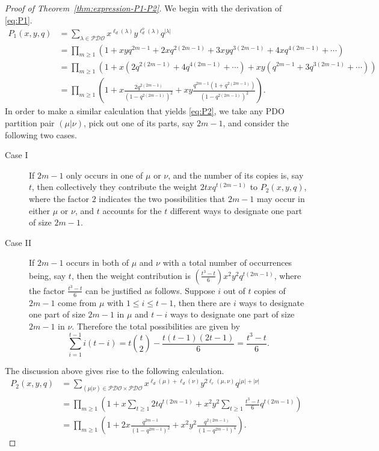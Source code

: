\documentclass[11pt,reqno]{amsart}
\numberwithin{equation}{section}
\theoremstyle{plain}
\theoremstyle{definition}
\theoremstyle{named}
\newcommand{\abs}[1]{\left|#1\right|}
\def\PDOset{\mathcal{PDO}}
\def\ld{\ell_d}
\def\lr{\ell_r}
\begin{document}
\begin{proof}[Proof of Theorem~\ref{thm:expression-P1-P2}]
We begin with the derivation of \eqref{eq:P1}.
\begin{align*}
P_1(x,y,q) &= \sum_{\lambda\in\PDOset}x^{\ell_d(\lambda)}y^{\ell_d^o(\lambda)}q^{\abs{\lambda}}\\
&= \prod_{m\ge 1}(1+xyq^{2m-1}+2xq^{2(2m-1)}+3xyq^{3(2m-1)}+4xq^{4(2m-1)}+\cdots)\\
&= \prod_{m\ge 1}(1+x(2q^{2(2m-1)}+4q^{4(2m-1)}+\cdots)+xy(q^{2m-1}+3q^{3(2m-1)}+\cdots))\\
&= \prod_{m\ge 1}\left(1+x\frac{2q^{2(2m-1)}}{(1-q^{2(2m-1)})^2}+xy\frac{q^{2m-1}(1+q^{2(2m-1)})}{(1-q^{2(2m-1)})^2}\right).
\end{align*}
In order to make a similar calculation that yields \eqref{eq:P2}, we take any PDO partition pair $(\mu | \nu)$, pick out one of its parts, say $2m-1$, and consider the following two cases.
\begin{description}
    \item[Case I] If $2m-1$ only occurs in one of $\mu$ or $\nu$, and the number of its copies is, say $t$, then collectively they contribute the weight $2txq^{t(2m-1)}$ to $P_2(x,y,q)$, where the factor $2$ indicates the two possibilities that $2m-1$ may occur in either $\mu$ or $\nu$, and $t$ accounts for the $t$ different ways to designate one part of size $2m-1$.
    \item[Case II] If $2m-1$ occurs in both of $\mu$ and $\nu$ with a total number of occurrences being, say $t$, then the weight contribution is $(\frac{t^3-t}{6})x^2y^2q^{t(2m-1)}$, where the factor $\frac{t^3-t}{6}$ can be justified as follows. Suppose $i$ out of $t$ copies of $2m-1$ come from $\mu$ with $1\le i\le t-1$, then there are $i$ ways to designate one part of size $2m-1$ in $\mu$ and $t-i$ ways to designate one part of size $2m-1$ in $\nu$. Therefore the total possibilities are given by
    $$\sum_{i=1}^{t-1}i(t-i)=t\binom{t}{2}-\frac{t(t-1)(2t-1)}{6}=\frac{t^3-t}{6}.$$ 
\end{description}
The discussion above gives rise to the following calculation.
\begin{align*}
P_2(x,y,q) &= \sum_{(\mu | \nu)\in\PDOset\times\PDOset}x^{\ld(\mu)+\ld(\nu)}y^{2\lr(\mu,\nu)}q^{|\mu|+|\nu|}\\
&= \prod_{m\ge 1}\left(1+x\sum_{t\ge 1}2tq^{t(2m-1)}+x^2y^2\sum_{t\ge 1}\frac{t^3-t}{6}q^{t(2m-1)}\right)\\
&= \prod_{m\ge 1}\left(1+2x\frac{q^{2m-1}}{(1-q^{2m-1})^2}+x^2y^2\frac{q^{2(2m-1)}}{(1-q^{2m-1})^4}\right).
\end{align*}
\end{proof}
\end{document}

